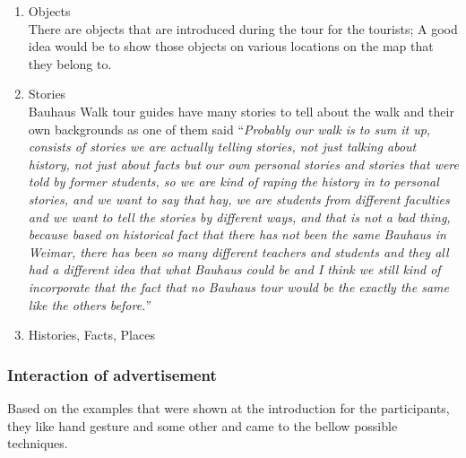 \begin {enumerate}

\item	Objects \\
There are objects that are introduced during the tour for the tourists; A good idea would be to show those objects on various locations on the map that they belong to.
\item	Stories \\
Bauhaus Walk tour guides have many stories to tell about the walk and their own backgrounds as one of them said ``\emph{Probably our walk is to sum it up, consists of stories we are actually telling stories, not just talking about history, not just about facts but our own personal stories and stories that were told by former students, so we are kind of raping the history in to personal stories, and we want to say that hay, we are students from different faculties and we want to tell the stories by different ways, and that is not a bad thing, because based on historical fact that there has not been the same Bauhaus in Weimar, there has been so many different teachers and students and they all had a different idea that what Bauhaus could be and I think we still kind of incorporate that the fact that no Bauhaus tour would be the exactly the same like the others before.}''
\item	Histories, Facts, Places

\end{enumerate}

\subsubsection{Interaction of advertisement}
Based on the examples that were shown at the introduction for the participants, they like hand gesture and some other and came to the bellow possible techniques.

